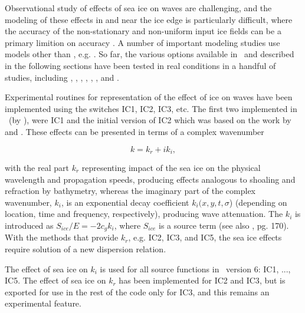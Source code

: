 Observational study of effects of sea ice on waves are challenging, and the modeling of these effects in and near the ice edge is particularly difficult, where the accuracy of the non-stationary and non-uniform input ice fields can be a primary limition on accuracy \citep{rep:RPLA18}. A number of important modeling studies use models other than \ws, e.g. \cite{art:DB13}. So far, the various options available in \ws\ and described in the following sections have been tested in real conditions in a handful of studies, including \cite{art:LKS15}, \cite{art:Aea16}, \cite{art:WHR16}, \cite{art:RTS16}, \cite{rep:RPLA18}, \cite{art:CRT17}, and \cite{Liu2018ic5}.


\noindent
Experimental routines for representation of the effect of ice on waves have
been implemented using the switches {\code IC1}, {\code IC2}, {\code IC3}, etc. The first two implemented in \ws\ (by \cite{rep:RO13}), were {\code IC1} and the initial version of {\code IC2} which was based on the work by \cite{art:LMC88} and \cite{art:LHV91}. These effects can be presented in terms of a complex wavenumber

\begin{equation}\label{eq:waveno}
     {k} = {k_r} + i{k_i},
\end{equation}

\noindent
with the real part ${k_r}$ representing impact of the sea ice on the physical
wavelength and propagation speeds, producing effects analogous to shoaling and
refraction by bathymetry, whereas the imaginary part of the complex
wavenumber, ${k_i}$, is an exponential decay coefficient
${k_i}({x},{y},{t},\sigma $) (depending on location, time and frequency,
respectively), producing wave attenuation.  The ${k_i}$ is introduced as
${S_{ice}}/{E}=-2{c_g}{k_i}$, where ${S_{ice}}$ is a source term (see also
\cite{bk:WAM94}, pg. 170).  With the methods that provide  ${k_r}$, e.g. {\code IC2}, 
{\code IC3}, and {\code IC5}, the sea ice effects 
require solution of a new dispersion relation.

The effect of sea ice on ${k_i}$ is used for all source functions in \ws\ version 6:
{\code IC1}, ..., {\code IC5}. The effect of sea ice on ${k_r}$ has
been implemented for {\code IC2} and {\code IC3}, but is exported for use in
the rest of the code only for {\code IC3}, and this remains an experimental feature.


